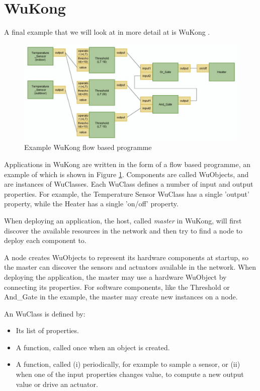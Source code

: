 \section{WuKong}
\label{sec-state-of-the-art-wukong}
A final example that we will look at in more detail at is WuKong \cite{Reijers:2013ut, Lin:2013dc}.


\begin{figure}
\centering
\includegraphics[width=0.8\linewidth]{wukong-fbp.png}
\caption{Example WuKong flow based programme}
\label{fig-wukong-fbp}
\end{figure}


Applications in WuKong are written in the form of a flow based programme, an example of which is shown in Figure \ref{fig-wukong-fbp}. Components are called WuObjects, and are instances of WuClasses. Each WuClass defines a number of input and output properties. For example, the Temperature Sensor WuClass has a single 'output' property, while the Heater has a single 'on/off' property.

When deploying an application, the host, called \emph{master} in WuKong, will first discover the available resources in the network and then try to find a node to deploy each component to.

A node creates WuObjects to represent its hardware components at startup, so the master can discover the sensors and actuators available in the network. When deploying the application, the master may use a hardware WuObject by connecting its properties. For software components, like the Threshold or And\_Gate in the example, the master may create new instances on a node.

An WuClass is defined by:
\begin{itemize}
    \item Its list of properties.
    \item A  function, called once when an object is created.
    \item A  function, called (i) periodically, for example to sample a sensor, or (ii) when one of the input properties changes value, to compute a new output value or drive an actuator.
\end{itemize}

